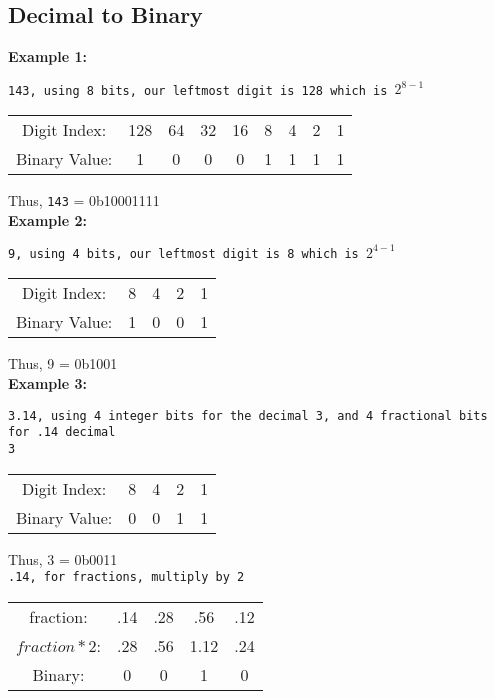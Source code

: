 \documentclass{article}
\begin{document}
\subsection*{Decimal to Binary}
\textbf{Example 1:}

\texttt{143, using 8 bits, our leftmost digit is 128 which is $2^{8-1}$}

\begin{center}
\begin{tabular}{c c c c c c c c c}
Digit Index: & 128 & 64 & 32 & 16 & 8 & 4 & 2 & 1 \\
Binary Value: & 1 & 0 & 0 & 0 & 1 & 1 & 1 & 1 \\
\end{tabular}
\end{center} 

\noindent Thus, \texttt{143} = 0b10001111 \\


\noindent \textbf{Example 2:} 

\texttt{9, using 4 bits, our leftmost digit is 8 which is $2^{4-1}$}

\begin{center}
\begin{tabular}{c c c c c}
Digit Index: & 8 & 4 & 2 & 1 \\
Binary Value: & 1 & 0 & 0 & 1 \\
\end{tabular}
\end{center}

\noindent Thus, 9  = 0b1001 \\

\noindent \textbf{Example 3:}

\texttt{3.14, using 4 integer bits for the decimal 3, and 4 fractional bits for .14 decimal } \\

\texttt{3}

\begin{center}
\begin{tabular}{c c c c c}
Digit Index: & 8 & 4 & 2 & 1 \\
Binary Value: & 0 & 0 & 1 & 1 \\
\end{tabular}
\end{center}

\noindent Thus, 3 = 0b0011 \\

\texttt{.14, for fractions, multiply by 2}

\begin{center}
\begin{tabular}{c c c c c}
fraction: & .14 & .28 & .56 & .12 \\
$fraction * 2$: & .28 & .56 & 1.12 & .24 \\
Binary: & 0 & 0 & 1 & 0 \\
\end{tabular}
\end{center}
\end{document}
